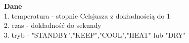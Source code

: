 \documentclass{article}
\begin{document}
\textbf{Dane}\\
1. temperatura - stopnie Celsjusza z dokładnością do 1 \\
2. czas - dokładność do sekundy \\
3. tryb - "STANDBY","KEEP","COOL","HEAT" lub "DRY" \\
\end{document}
